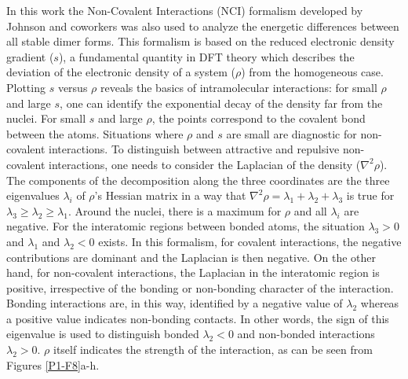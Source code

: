 		In this work the Non-Covalent Interactions (NCI) formalism developed by Johnson and coworkers\cite{johnson2010revealing} was also used to analyze the energetic differences between all stable dimer forms. This formalism is based on the reduced electronic density gradient ($s$), a fundamental quantity in DFT theory which describes the deviation of the electronic density of a system ($\rho$) from the homogeneous case. Plotting $s$ versus $\rho$ reveals the basics of intramolecular interactions: for small $\rho$ and large $s$, one can identify the exponential decay of the density far from the nuclei. For small $s$ and large $\rho$, the points correspond to the covalent bond between the atoms. Situations where $\rho$ and $s$ are small are diagnostic for non-covalent interactions. To distinguish between attractive and repulsive non-covalent interactions, one needs to consider the Laplacian of the density ($\nabla^{2} \rho$).\\
		
		The components of the decomposition along the three coordinates are the three eigenvalues $\lambda_{i}$ of $\rho$'s Hessian matrix in a way that $\nabla^{2} \rho = \lambda_{1} + \lambda_{2} + \lambda_{3}$ is true for $\lambda_{3} \geq \lambda_{2} \geq \lambda_1$. Around the nuclei, there is a maximum for $\rho$ and all $\lambda_i$ are negative. For the interatomic regions between bonded atoms, the situation $\lambda_{3} > 0$ and $\lambda_{1}$ and $\lambda_{2} < 0$ exists. In this formalism, for covalent interactions, the negative contributions are dominant and the Laplacian is then negative. On the other hand, for non-covalent interactions, the Laplacian in the interatomic region is positive, irrespective of the bonding or non-bonding character of the interaction. Bonding interactions are, in this way, identified by a negative value of $\lambda_{2}$ whereas a positive value indicates non-bonding contacts. In other words, the sign of this eigenvalue is used to distinguish bonded $\lambda_{2} < 0$ and non-bonded interactions $\lambda_{2} > 0$.  $\rho$ itself indicates the strength of the interaction, as can be seen from Figures \ref{P1-F8}a-h.\\
		
